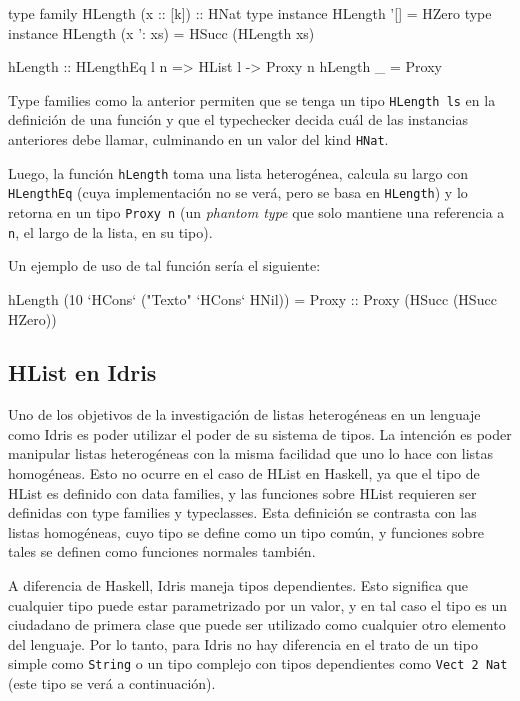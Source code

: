 \begin{code}
type family HLength (x :: [k]) :: HNat
type instance HLength '[] = HZero
type instance HLength (x ': xs) = HSucc (HLength xs)

hLength   :: HLengthEq l n => HList l -> Proxy n
hLength _ =  Proxy
\end{code}

Type families como la anterior permiten que se tenga un tipo \texttt{HLength ls} en la definición de una función y que el typechecker decida cuál de las instancias anteriores debe llamar, culminando en un valor del kind \texttt{HNat}.

Luego, la función \texttt{hLength} toma una lista heterogénea, calcula su largo con \texttt{HLengthEq} (cuya implementación no se verá, pero se basa en \texttt{HLength}) y lo retorna en un tipo \texttt{Proxy n} (un \textit{phantom type} que solo mantiene una referencia a \texttt{n}, el largo de la lista, en su tipo).

Un ejemplo de uso de tal función sería el siguiente:

\begin{code}
hLength (10 `HCons` ("Texto" `HCons` HNil)) = 
  Proxy :: Proxy (HSucc (HSucc HZero))
\end{code}

\subsection{HList en Idris}

Uno de los objetivos de la investigación de listas heterogéneas en un lenguaje como Idris es poder utilizar el poder de su sistema de tipos. La intención es poder manipular listas heterogéneas con la misma facilidad que uno lo hace con listas homogéneas. Esto no ocurre en el caso de HList en Haskell, ya que el tipo de HList es definido con data families, y las funciones sobre HList requieren ser definidas con type families y typeclasses. Esta definición se contrasta con las listas homogéneas, cuyo tipo se define como un tipo común, y funciones sobre tales se definen como funciones normales también.

A diferencia de Haskell, Idris maneja tipos dependientes. Esto significa que cualquier tipo puede estar parametrizado por un valor, y en tal caso el tipo es un ciudadano de primera clase que puede ser utilizado como cualquier otro elemento del lenguaje. Por lo tanto, para Idris no hay diferencia en el trato de un tipo simple como \texttt{String} o un tipo complejo con tipos dependientes como \texttt{Vect 2 Nat} (este tipo se verá a continuación).

